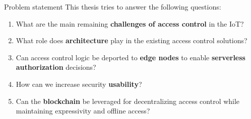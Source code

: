 \begin{frame}{Problem statement}
This thesis tries to answer the following questions:
    \begin{enumerate}
        \item What are the main remaining \textbf{challenges 
            of access control} in the IoT? \pause
        \item What role does \textbf{architecture} play in 
            the existing access control solutions? \pause
        \item Can access control logic be deported to 
            \textbf{edge nodes} to enable \textbf{serverless 
            authorization} decisions? \pause
        \item How can we increase security \textbf{usability}? \pause
        \item Can the \textbf{blockchain} be leveraged for 
            decentralizing access control while maintaining 
            expressivity and offline access?
    \end{enumerate}
    
    
\end{frame}